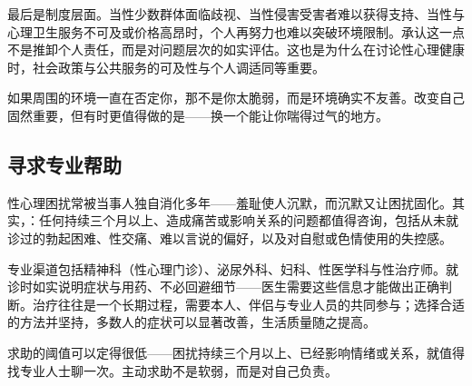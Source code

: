 最后是制度层面。当性少数群体面临歧视、当性侵害受害者难以获得支持、当性与心理卫生服务不可及或价格高昂时，个人再努力也难以突破环境限制。承认这一点不是推卸个人责任，而是对问题层次的如实评估。这也是为什么在讨论性心理健康时，社会政策与公共服务的可及性与个人调适同等重要。

\begin{tcolorbox}[colback=pink!5!white,colframe=red!50!black,title=贴心小叮咛]
如果周围的环境一直在否定你，那不是你太脆弱，而是环境确实不友善。改变自己固然重要，但有时更值得做的是——换一个能让你喘得过气的地方。
\end{tcolorbox}
\subsection{寻求专业帮助}

性心理困扰常被当事人独自消化多年——羞耻使人沉默，而沉默又让困扰固化。其实，：任何持续三个月以上、造成痛苦或影响关系的问题都值得咨询，包括从未就诊过的勃起困难、性交痛、难以言说的偏好，以及对自慰或色情使用的失控感。

专业渠道包括精神科（性心理门诊）、泌尿外科、妇科、性医学科与性治疗师。就诊时如实说明症状与用药、不必回避细节——医生需要这些信息才能做出正确判断。治疗往往是一个长期过程，需要本人、伴侣与专业人员的共同参与；选择合适的方法并坚持，多数人的症状可以显著改善，生活质量随之提高。

\begin{tcolorbox}[colback=pink!5!white,colframe=red!50!black,title=贴心小叮咛]
求助的阈值可以定得很低——困扰持续三个月以上、已经影响情绪或关系，就值得找专业人士聊一次。主动求助不是软弱，而是对自己负责。
\end{tcolorbox}
